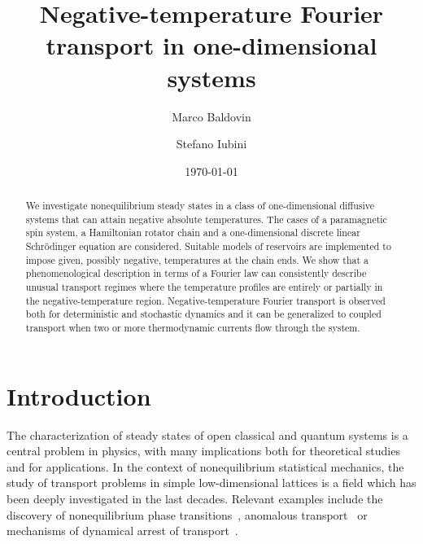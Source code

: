 \documentclass[iop, twocolumns, amssymb,notitlepage]{revtex4-1}
\begin{document}
\title{Negative-temperature Fourier transport in one-dimensional systems}
\author{Marco Baldovin}
\author{Stefano Iubini}


\date{\today}

\begin{abstract}
We investigate nonequilibrium steady states in a class of one-dimensional diffusive systems that can attain negative absolute temperatures. The cases of a paramagnetic spin system, a Hamiltonian rotator chain and a one-dimensional discrete linear Schr\"odinger equation are considered. 
 Suitable models of reservoirs are implemented to impose given, possibly negative, temperatures
at the chain ends. We show that a phenomenological description in terms
of a Fourier law can consistently describe unusual transport regimes where the temperature profiles are entirely or partially in the negative-temperature region. Negative-temperature Fourier  transport  is observed both for deterministic and stochastic dynamics and it can be generalized to coupled transport when two or more thermodynamic currents flow through the system.


\end{abstract}

\maketitle %

\section{Introduction}
\label{sec:Intro}

The characterization of steady states of open classical and quantum systems 
is a central problem in physics, with many implications both for theoretical studies and for applications.
In the context of  nonequilibrium statistical mechanics, the study of  transport problems in  simple low-dimensional lattices is a field which has been deeply investigated in the last 
decades. Relevant examples include the discovery 
of nonequilibrium phase transitions~\cite{derrida98, tauber17}, anomalous transport~\cite{lepri03} or mechanisms of
dynamical arrest of transport~\cite{pino16}.
\end{document}
